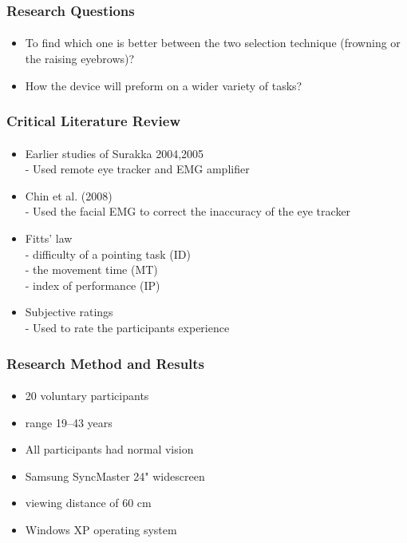 \documentclass{beamer}
\begin{document}
\begin{frame}
\frametitle{Research Questions}
\framesubtitle{}
\begin{itemize}
\item To find which one is better between the two selection technique (frowning or the raising eyebrows)?
\item How the device will preform on a wider variety of tasks?
\end{itemize} 
\end{frame}

\begin{frame}
\frametitle{Critical Literature Review}
\framesubtitle{}
\begin{itemize}
\item Earlier studies of Surakka 2004,2005 \\
- Used remote eye tracker and EMG amplifier	
\item Chin et al. (2008) \\
- Used the facial EMG to correct the inaccuracy of the eye tracker
\item Fitts’ law \\
- difficulty of a pointing task (ID) \\
- the movement time (MT)\\
- index of performance (IP) 
\item Subjective ratings \\
- Used to rate the participants experience
 
\end{itemize}

\end{frame}

\begin{frame}
\frametitle{Research Method and Results}
\framesubtitle{}

\begin{itemize}
\item 20 voluntary participants
\item range 19–43 years
\item All participants had normal vision
\item Samsung SyncMaster 24" widescreen 
\item viewing distance of 60 cm
\item Windows XP operating system

\end{itemize}

\end{frame}
\end{document}
